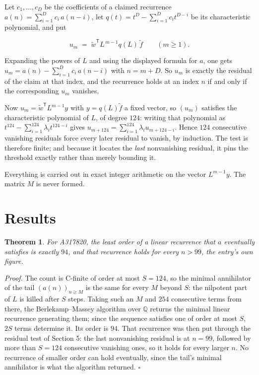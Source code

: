 \documentclass[11pt]{article}
\newtheorem{theorem}{Theorem}
\theoremstyle{definition}
\begin{document}
Let $c_1,\dots,c_D$ be the coefficients of a claimed recurrence $a(n) = \sum_{i=1}^{D} c_i\,a(n-i)$, let $q(t) = t^{D} - \sum_{i=1}^{D} c_i t^{D-i}$ be its characteristic polynomial, and put

\[u_m \;=\; \tilde w^{\mathsf T} L^{\,m-1} q(L)\,\tilde f \qquad (m \ge 1).\]

Expanding the powers of $L$ and using the displayed formula for $a$, one gets $u_m = a(n) - \sum_{i=1}^{D} c_i\,a(n-i)$ with $n = m + D$. So $u_m$ is exactly the residual of the claim at that index, and the recurrence holds at an index $n$ if and only if the corresponding $u_m$ vanishes.

Now $u_m = \tilde w^{\mathsf T} L^{m-1} y$ with $y = q(L)\tilde f$ a fixed vector, so $(u_m)$ satisfies the characteristic polynomial of $L$, of degree $124$: writing that polynomial as $t^{124} - \sum_{i=1}^{124} \lambda_i t^{124-i}$ gives $u_{m+124} = \sum_{i=1}^{124} \lambda_i u_{m+124-i}$. Hence $124$ consecutive vanishing residuals force every later residual to vanish, by induction. The test is therefore finite; and because it locates the {\itshape last} nonvanishing residual, it pins the threshold exactly rather than merely bounding it.

Everything is carried out in exact integer arithmetic on the vector $L^{m-1}y$. The matrix $M$ is never formed.

\section{Results}

\begin{theorem} For A317820, the least order of a linear recurrence that $a$ eventually satisfies is exactly $94$, and that recurrence holds for every $n > 99$, the entry's own figure.\end{theorem}

{\itshape Proof.} The count is C-finite of order at most $S = 124$, so the minimal annihilator of the tail $(a(n))_{n \ge M}$ is the same for every $M$ beyond $S$: the nilpotent part of $L$ is killed after $S$ steps. Taking such an $M$ and $254$ consecutive terms from there, the Berlekamp--Massey algorithm over $\mathbb{Q}$ returns the minimal linear recurrence generating them; since the sequence satisfies one of order at most $S$, $2S$ terms determine it. Its order is $94$. That recurrence was then put through the residual test of Section 5: the last nonvanishing residual is at $n = 99$, followed by more than $S = 124$ consecutive vanishing ones, so it holds for every larger $n$. No recurrence of smaller order can hold eventually, since the tail's minimal annihilator is what the algorithm returned. $\square$
\end{document}
